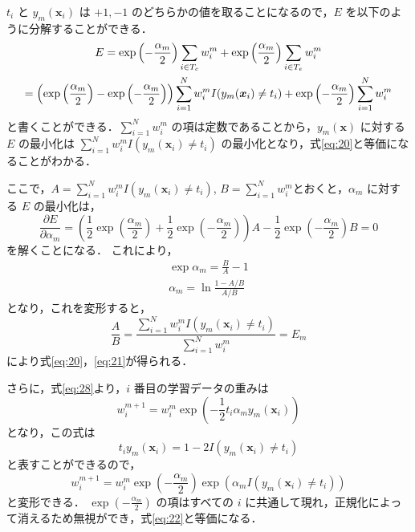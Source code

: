 \documentclass[dvipdfmx]{jreport}
\begin{document}
$t_i$ と $y_m(\bm{x}_i)$ は $+1, -1$ のどちらかの値を取ることになるので，$E$ を以下のように分解することができる．
\begin{gather}
E = \exp\left(-\frac{\alpha_m}{2}\right) \sum_{i \in T_c} w_i^{m} + \exp\left(\frac{\alpha_m}{2}\right) \sum_{i \in T_e} w_i^{m} \notag \\
=\left(\exp\left(\frac{\alpha_m}{2}\right) - \exp\left(-\frac{\alpha_m}{2}\right)\right) \sum_{i = 1}^N w_i^m I(y_m(\bm{x}_i) \neq t_i) + \exp\left(-\frac{\alpha_m}{2}\right) \sum_{i=1}^N w_i^m \label{eq:29}
\end{gather}
と書くことができる．$\sum_{i=1}^N w_i^m$ の項は定数であることから，$y_m(\bm{x})$ に対する $E$ の最小化は $\sum_{i = 1}^N w_i^m I(y_m(\bm{x}_i) \neq t_i)$ の最小化となり，式\eqref{eq:20}と等価になることがわかる．

ここで，$A = \sum_{i = 1}^N w_i^m I(y_m(\bm{x}_i) \neq t_i)$, $B = \sum_{i=1}^N w_i^m$とおくと，$\alpha_m$ に対する $E$ の最小化は，
\begin{equation}
\frac{\partial E}{\partial \alpha_m} = \left(\frac{1}{2} \exp\left(\frac{\alpha_m}{2}\right) + \frac{1}{2} \exp\left(-\frac{\alpha_m}{2}\right)\right) A - \frac{1}{2} \exp\left(-\frac{\alpha_m}{2}\right) B = 0 \label{eq:30}
\end{equation}
を解くことになる．
これにより，
\begin{gather}
\exp\alpha_m = \frac{B}{A} - 1\label{eq:32}\\
\alpha_m = \ln \frac{1-A/B}{A/B}
\end{gather}
となり，これを変形すると，
\begin{equation}
\frac{A}{B} = \frac{\sum_{i=1}^{N} w_i^m I(y_m(\bm{x}_i) \neq t_i)}{\sum_{i=1}^{N} w_i^m} = E_m
\end{equation}
により式\eqref{eq:20}，\eqref{eq:21}が得られる．

さらに，式\eqref{eq:28}より，$i$ 番目の学習データの重みは
\begin{equation}
w_i^{m+1} = w_i^{m} \exp\left(-\frac{1}{2} t_i \alpha_m y_m(\bm{x}_i)\right)
\end{equation}
となり，この式は
\begin{equation}
t_i y_m(\bm{x}_i) = 1 - 2I(y_m(\bm{x}_i) \neq t_i)
\end{equation}
と表すことができるので，
\begin{equation}
w_i^{m+1} = w_i^{m} \exp\left(-\frac{\alpha_m}{2}\right) \exp(\alpha_m I(y_m(\bm{x}_i) \neq t_i))
\end{equation}
と変形できる．
$\exp\left(-\frac{\alpha_m}{2}\right)$ の項はすべての $i$ に共通して現れ，正規化によって消えるため無視ができ，式\eqref{eq:22}と等価になる．
\end{document}
